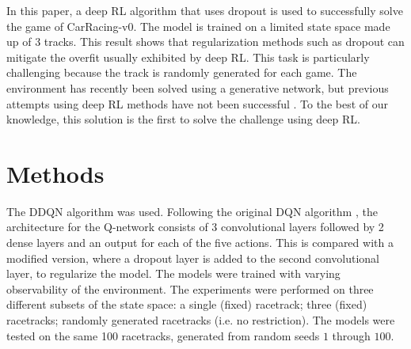 \documentclass{article}
\begin{document}
In this paper, a deep RL algorithm that uses dropout
\cite{Dropout} is used to successfully solve the game of
CarRacing-v0\cite{CarRacing}. The model is trained on a
limited state space made up of 3 tracks. This result shows that regularization methods such as 
dropout can mitigate the overfit usually exhibited by deep RL. This
task is particularly challenging because the track is randomly
generated for each game. The environment has recently been solved
using a generative network, but previous attempts using deep RL
methods have not been successful \cite{World_Models}
\cite{CarRacing1}. To the best of our knowledge, this solution is the
first to solve the challenge using deep RL.  

\section{Methods}
The DDQN algorithm \cite{DDQN} was used.
Following the original DQN algorithm \cite{DQN}, the architecture
for the Q-network consists of 3 convolutional layers followed by 2
dense layers and an output for each of the five actions.
This is compared with a modified version, where a dropout layer is
added to the second convolutional layer, to regularize the model.  
The models were trained with varying observability of the
environment. The experiments were performed on three different subsets of
the state space: a single (fixed) racetrack; three (fixed) racetracks;
randomly generated racetracks (i.e. no restriction). The models were
tested on the same 100 racetracks, generated from random seeds $1$
through $100$.
\end{document}

